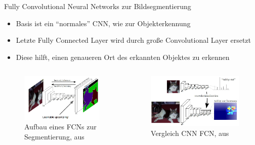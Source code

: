\documentclass[9pt]{beamer}
\begin{document}
\begin{frame}{Fully Convolutional Neural Networks zur Bildsegmentierung}
\begin{itemize}
	\item Basis ist ein \enquote{normales} CNN, wie zur Objekterkennung
	\item Letzte Fully Connected Layer wird durch große Convolutional Layer ersetzt
	\item Diese hilft, einen genaueren Ort des erkannten Objektes zu erkennen
\end{itemize}
\bigskip
\begin{columns}
	\begin{column}{.5\textwidth}
		\begin{figure}[H]
			\includegraphics[width=\textwidth, keepaspectratio]{fcn.png}
			\caption{Aufbau eines FCNs zur Segmentierung, aus \footnotemark[1]}
		\end{figure}
	\end{column}
	\begin{column}{.5\textwidth}
		\begin{figure}[H]
			\includegraphics[width=\textwidth, keepaspectratio]{fcn2.jpg}
			\caption{Vergleich CNN FCN, aus \footnotemark[1]}
		\end{figure}
	\end{column}
\end{columns}	
\end{frame}
\end{document}
